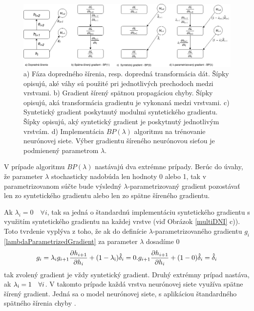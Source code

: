 \begin{figure}
\centerline{\includegraphics[width=1\textwidth]{images/BpLambda}}
\caption[Porovnanie šírenia gradientu s využitím algoritmu $BP(\lambda)$]{a) Fáza dopredného šírenia, resp. dopredná transformácia dát. Šípky opisujú, aké váhy sú použité pri jednotlivých prechodoch medzi vrstvami. b) Gradient šírený spätnou propagáciou chyby. Šípky opisujú, aká transformácia gradientu je vykonaná medzi vrstvami. c) Syntetický gradient poskytnutý modulmi syntetického gradientu. Šípky opisujú, aký syntetický gradient je poskytnutý jednotlivým vrstvám. d) Implementácia $BP(\lambda)$ algoritmu na trénovanie neurónovej siete. Výber gradientu šíreného neurónovou sieťou je podmienený parametrom $\lambda$.
\cite{Jaderberg2016}}
\label{BPlambdaAlgoritmus}
\end{figure}

V prípade algoritmu $BP(\lambda)$ nastávajú dva extrémne prípady. Berúc do úvahy, že parameter $\lambda$ stochasticky nadobúda len hodnoty 0 alebo 1, tak v parametrizovanom súčte bude výsledný $\lambda$-parametrizovaný gradient pozostávať len zo syntetického gradientu alebo len zo spätne šíreného gradientu. 

Ak $\lambda_i = 0 \quad \forall i$, tak sa jedná o štandardnú implementáciu syntetického gradientu s využitím syntetického gradientu na každej vrstve (viď Obrázok \ref{multiDNI} c)). Toto tvrdenie vyplýva z toho, že ak do definície $\lambda$-parametrizovaného gradientu $g_i$ \ref{lambdaParametrizedGradient} za parameter $\lambda$ dosadíme 0 \[    g_i=\lambda_i g_{i+1} \frac{\partial h_{i+1}}{\partial h_i}+(1-\lambda\textsubscript{i})\hat{\delta}_i=0.g_{i+1} \frac{\partial h_{i+1}}{\partial h_i}+(1-0)\hat{\delta}_i=\hat{\delta}_i\] tak zvolený gradient je vždy syntetický gradient. Druhý extrémny prípad nastáva, ak $\lambda\textsubscript{i} = 1 \quad \forall i$. V takomto prípade každá vrstva neurónovej siete využíva spätne šírený gradient. Jedná sa o model neurónovej siete, s aplikáciou štandardného spätného šírenia chyby \cite{Jaderberg2016}.

